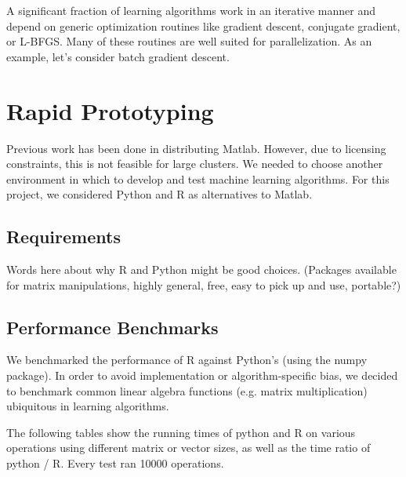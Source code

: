 \documentclass[%
        final,
        notitlepage,
        narroweqnarray,
        inline,
        ]{ieee}
\begin{document}
A significant fraction of learning algorithms work in an iterative manner and
depend on generic optimization routines like gradient descent, conjugate
gradient, or L-BFGS. Many of these routines are well suited for parallelization.
As an example, let's consider batch gradient descent.

\section{Rapid Prototyping}

Previous work has been done in distributing Matlab. However, due to licensing
constraints, this is not feasible for large clusters. We needed to choose
another environment in which to develop and test machine learning
algorithms. For this project, we considered Python and R as alternatives to
Matlab.

\subsection{Requirements}

Words here about why R and Python might be good choices. (Packages available
for matrix manipulations, highly general, free, easy to pick up and use,
portable?)

\subsection{Performance Benchmarks}

We benchmarked the performance of R against Python's (using the numpy package). In order to avoid implementation or algorithm-specific bias, we decided to benchmark common linear algebra functions (e.g. matrix multiplication) ubiquitous in learning algorithms.

The following tables show the running times of python and R on various operations using different matrix or vector sizes, as well as the time ratio of python / R. Every test ran 10000 operations.
\end{document}
